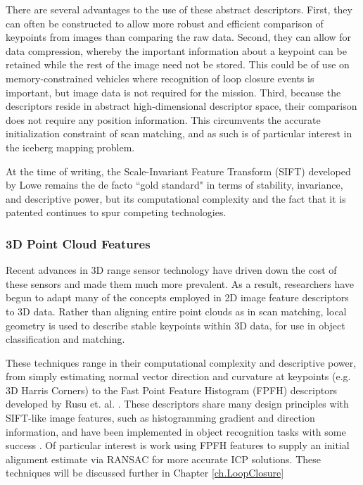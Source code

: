 There are several advantages to the use of these abstract descriptors. First, they can often be constructed to allow more robust and efficient comparison of keypoints from images than comparing the raw data. Second, they can allow for data compression, whereby the important information about a keypoint can be retained while the rest of the image need not be stored. This could be of use on memory-constrained vehicles where recognition of loop closure events is important, but image data is not required for the mission. Third, because the descriptors reside in abstract high-dimensional descriptor space, their comparison does not require any position information. This circumvents the accurate initialization constraint of scan matching, and as such is of particular interest in the iceberg mapping problem.

At the time of writing, the Scale-Invariant Feature Transform (SIFT) developed by Lowe \cite{Lowe} remains the de facto ``gold standard" in terms of stability, invariance, and descriptive power, but its computational complexity and the fact that it is patented continues to spur competing technologies. \cite{challengers}

\subsubsection{3D Point Cloud Features}

Recent advances in 3D range sensor technology have driven down the cost of these sensors and made them much more prevalent. As a result, researchers have begun to adapt many of the concepts employed in 2D image feature descriptors to 3D data. Rather than aligning entire point clouds as in scan matching, local geometry is used to describe stable keypoints within 3D data, for use in object classification and matching. 

These techniques range in their computational complexity and descriptive power, from simply estimating normal vector direction and curvature at keypoints (e.g. 3D Harris Corners) to the Fast Point Feature Histogram (FPFH) descriptors developed by Rusu et. al. \cite{PFH}. These descriptors share many design principles with SIFT-like image features, such as histogramming gradient and direction information, and have been implemented in object recognition tasks with some success \cite{FPFH}. Of particular interest is work using FPFH features to supply an initial alignment estimate via RANSAC for more accurate ICP solutions. These techniques will be discussed further in Chapter \ref{ch.LoopClosure}

